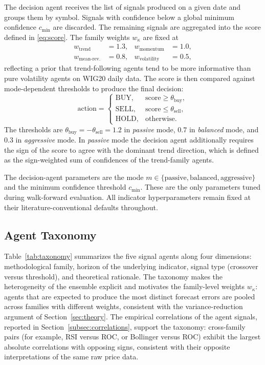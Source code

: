 \documentclass{ieeeaccess}
\begin{document}
The decision agent receives the list of signals produced on a given date and groups them by symbol. Signals with confidence below a global minimum confidence $c_{\min}$ are discarded. The remaining signals are aggregated into the score defined in \eqref{eq:score}. The family weights $w_\kappa$ are fixed at
\begin{equation}
\begin{aligned}
w_\mathrm{trend} &= 1.3, & w_\mathrm{momentum} &= 1.0, \\
w_\mathrm{mean\text{-}rev.} &= 0.8, & w_\mathrm{volatility} &= 0.5,
\end{aligned}
\end{equation}
reflecting a prior that trend-following agents tend to be more informative than pure volatility agents on WIG20 daily data. The score is then compared against mode-dependent thresholds to produce the final decision:
\begin{equation}
\mathrm{action} =
\begin{cases}
\mathrm{BUY}, & \mathrm{score} \geq \theta_\text{buy}, \\
\mathrm{SELL}, & \mathrm{score} \leq \theta_\text{sell}, \\
\mathrm{HOLD}, & \mathrm{otherwise}.
\end{cases}
\end{equation}
The thresholds are $\theta_\text{buy} = -\theta_\text{sell} = 1.2$ in \emph{passive} mode, $0.7$ in \emph{balanced} mode, and $0.3$ in \emph{aggressive} mode. In \emph{passive} mode the decision agent additionally requires the sign of the score to agree with the dominant trend direction, which is defined as the sign-weighted sum of confidences of the trend-family agents.

The decision-agent parameters are the mode $m \in \{\text{passive}, \text{balanced}, \text{aggressive}\}$ and the minimum confidence threshold $c_{\min}$. These are the only parameters tuned during walk-forward evaluation. All indicator hyperparameters remain fixed at their literature-conventional defaults throughout.

\subsection{Agent Taxonomy}
\label{subsec:taxonomy}

Table~\ref{tab:taxonomy} summarizes the five signal agents along four dimensions: methodological family, horizon of the underlying indicator, signal type (crossover versus threshold), and theoretical rationale. The taxonomy makes the heterogeneity of the ensemble explicit and motivates the family-level weights $w_\kappa$: agents that are expected to produce the most distinct forecast errors are pooled across families with different weights, consistent with the variance-reduction argument of Section~\ref{sec:theory}. The empirical correlations of the agent signals, reported in Section~\ref{subsec:correlations}, support the taxonomy: cross-family pairs (for example, RSI versus ROC, or Bollinger versus ROC) exhibit the largest absolute correlations with opposing signs, consistent with their opposite interpretations of the same raw price data.
\end{document}
